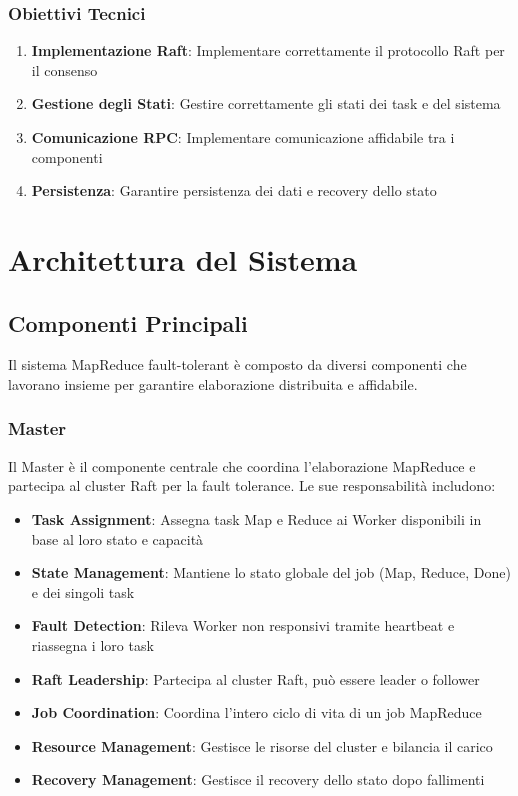 \documentclass[12pt,a4paper]{article}
\begin{document}
\subsubsection{Obiettivi Tecnici}

\begin{enumerate}
\item \textbf{Implementazione Raft}: Implementare correttamente il protocollo Raft per il consenso
\item \textbf{Gestione degli Stati}: Gestire correttamente gli stati dei task e del sistema
\item \textbf{Comunicazione RPC}: Implementare comunicazione affidabile tra i componenti
\item \textbf{Persistenza}: Garantire persistenza dei dati e recovery dello stato
\end{enumerate}

\section{Architettura del Sistema}

\subsection{Componenti Principali}

Il sistema MapReduce fault-tolerant è composto da diversi componenti che lavorano insieme per garantire elaborazione distribuita e affidabile.

\subsubsection{Master}

Il Master è il componente centrale che coordina l'elaborazione MapReduce e partecipa al cluster Raft per la fault tolerance. Le sue responsabilità includono:

\begin{itemize}
\item \textbf{Task Assignment}: Assegna task Map e Reduce ai Worker disponibili in base al loro stato e capacità
\item \textbf{State Management}: Mantiene lo stato globale del job (Map, Reduce, Done) e dei singoli task
\item \textbf{Fault Detection}: Rileva Worker non responsivi tramite heartbeat e riassegna i loro task
\item \textbf{Raft Leadership}: Partecipa al cluster Raft, può essere leader o follower
\item \textbf{Job Coordination}: Coordina l'intero ciclo di vita di un job MapReduce
\item \textbf{Resource Management}: Gestisce le risorse del cluster e bilancia il carico
\item \textbf{Recovery Management}: Gestisce il recovery dello stato dopo fallimenti
\end{itemize}
\end{document}
